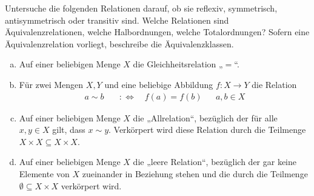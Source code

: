  
 
 
 
 \begin{aufg} \label{abstraktrel}
Untersuche die folgenden Relationen darauf, ob sie reflexiv, symmetrisch, antisymmetrisch oder transitiv sind. Welche Relationen sind Äquivalenzrelationen, welche Halbordnungen, welche Totalordnungen? Sofern eine Äquivalenzrelation vorliegt, beschreibe die Äquivalenzklassen.
\begin{enumerate}[a)]
	\item Auf einer beliebigen Menge $X$ die Gleichheitsrelation „$=$“.
	\item Für zwei Mengen $X,Y$ und eine beliebige Abbildung $f:X\to Y$ die Relation
	\begin{align*}
	 a\sim b \quad &:\Leftrightarrow\quad f(a)=f(b) && a,b\in X
	\end{align*}
          \item Auf einer beliebigen Menge $X$ die „Allrelation“, bezüglich der für alle $x,y\in X$ gilt, dass $x\sim y$. Verkörpert wird diese Relation durch die Teilmenge $X\times X\subseteq X\times X$.
        \item Auf einer beliebigen Menge $X$ die „leere Relation“, bezüglich der gar keine Elemente von $X$ zueinander in Beziehung stehen und die durch die Teilmenge $\emptyset\subseteq X\times X$ verkörpert wird.
\end{enumerate}
 \end{aufg}

 


